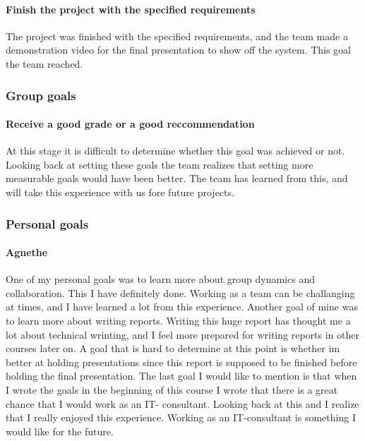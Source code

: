 \paragraph{Finish the project with the specified requirements}
The project was finished with the specified requirements, and the team made a demonstration video for the final presentation to show off the system. This goal the team reached. 

\subsubsection{Group goals}
\paragraph{Receive a good grade or a good reccommendation}
At this stage it is difficult to determine whether this goal was achieved or not. Looking back at setting these goals the team realizes that setting more measurable goals would have been better. The team has learned from this, and will take this experience with us fore future projects.

\subsubsection{Personal goals}

\paragraph{Agnethe}
One of my personal goals was to learn more about group dynamics and collaboration. This I have definitely done. Working as a team can be challanging at times, and I have learned a lot from this experience. Another goal of mine was to learn more about writing reports. Writing this huge report has thought me a lot about technical wrinting, and I feel more prepared for writing reports in other courses later on. A goal that is hard to determine at this point is whether im better at holding presentations since this report is supposed to be finished before holding the final presentation. The last goal I would like to mention is that when I wrote the goals in the beginning of this course I wrote that  there is a great chance that I would work as an IT- consultant. Looking back at this and I realize that I really enjoyed this experience. Working as an IT-consultant is something I would like for the future. 

